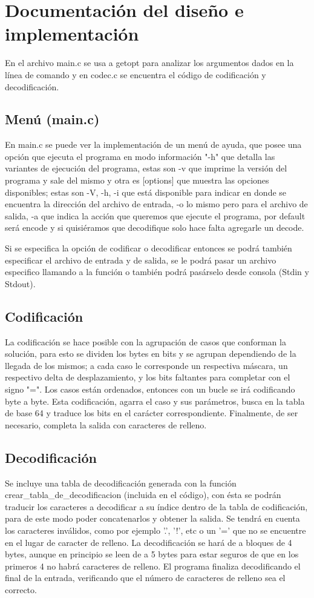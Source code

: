 \documentclass{article}
\begin{document}
\section{Documentación del diseño e implementación}
En el archivo main.c se usa a getopt para analizar los argumentos dados en la línea de comando y en codec.c se encuentra el código de codificación y decodificación.

\subsection{Menú (main.c)}
En  main.c se puede ver la implementación de un menú de ayuda, que posee una opción que ejecuta el programa en modo información "-h" que detalla las variantes de ejecución del programa, estas son -v que imprime la versión del programa y sale del mismo y otra es [options] que muestra las opciones disponibles; estas son -V, -h, -i que está disponible para indicar en donde se encuentra la dirección del archivo de entrada, -o lo mismo pero para el archivo de salida, -a que indica la acción que queremos que ejecute el programa, por default será encode y si quisiéramos que decodifique solo hace falta agregarle un decode.

Si se especifica la opción de codificar o decodificar entonces se podrá también especificar el archivo de entrada y de salida, se le podrá pasar un archivo especifico llamando a la función o también podrá pasárselo desde consola (Stdin y Stdout).

\subsection{Codificación}
La codificación se hace posible con la agrupación de casos que conforman la solución, para esto se dividen los bytes en bits y se agrupan dependiendo de la llegada de los mismos; a cada caso le corresponde un respectiva máscara, un respectivo delta de desplazamiento, y los bits faltantes para completar con el signo "=". Los casos están ordenados, entonces con un bucle se irá codificando byte a byte. Esta codificación, agarra el caso y sus parámetros, busca en la tabla de base 64 y traduce los bits en el carácter correspondiente. Finalmente, de ser necesario, completa la salida con caracteres de relleno.

\subsection{Decodificación}
Se incluye una tabla de decodificación generada con la función crear\_tabla\_de\_decodificacion (incluida en el código), con ésta se podrán traducir los caracteres a decodificar a su índice dentro de la tabla de codificación, para de este modo poder concatenarlos y obtener la salida. Se tendrá en cuenta los caracteres inválidos, como por ejemplo '.', '!', etc o un '=' que no se encuentre en el lugar de caracter de relleno.
La decodificación se hará de a bloques de 4 bytes, aunque en principio se leen de a 5 bytes para estar seguros de que en los primeros 4 no habrá caracteres de relleno. El programa finaliza decodificando el final de la entrada, verificando que el número de caracteres de relleno sea el correcto.
\end{document}
